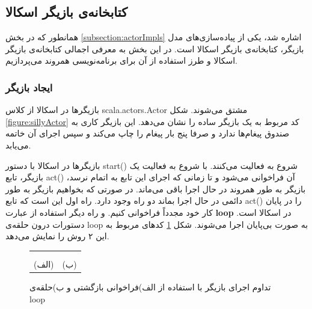 \subsection{کتابخانه‌ی بازیگر اسکالا}
\label{section:scalaActorLib}
همانطور که در بخش \ref{subsection:actorImpls} اشاره شد، یکی از پیاده‌سازی‌های مدل بازیگر، کتابخانه‌ی بازیگر اسکالا است. در این بخش به معرفی اجمالی کتابخانه‌ی بازیگر اسکالا و طرز استفاده از آن برای برنامه‌نویسی همروند می‌پردازیم.
\subsubsection{ایجاد بازیگر}
بازیگر‌ها در اسکالا از کلاس scala.actors.Actor مشتق می‌شوند.  شکل \ref{figure:sillyActor} کد مربوط به  یک بازیگر ساده را نشان می‌دهد. این بازیگر کاری به صندوق پیغام‌ها ندارد و صرفا پنج بار پیغام  را چاپ می‌کند و سپس اجرای آن خاتمه می‌یابد.


  بازیگر‌ها در اسکالا با دستور start() شروع به فعالیت می‌کنند. با شروع به فعالیت یک بازیگر، تابع act() آن فراخوانی می‌شود و تا زمانی که اجرای این تابع به اتمام نرسد، بازیگر به طور همروند در حال اجرا باقی می‌ماند. در صورتی که بخواهیم بازیگر به طور دائمی در حال اجرا بماند دو راه وجود دارد. راه اول این است که تابع act() را در پایان کار  خود مجدداً فراخوانی کنیم. و راه دیگر استفاده از عبارت \textbf{loop} در اسکالا است. دستورات درون حلقه‌ی loop به صورت بی‌پایان اجرا می‌شوند. شکل \ref{fig:endlessActor} کدهای مربوط به این ۲ روش را نمایش می‌دهد.

\begin{figure}
    \begin{center}
    \begin{tabular}{ c  c }
	 & \\

	\begin{latin}
\linespread{1.1}

\end{latin} & 
 \begin{latin}
	\linespread{1.1}
	
\end{latin}
 	\\
         (الف) & (ب) \\
    \end{tabular}
    \end{center}
    \caption{\label{fig:endlessActor} تداوم اجرای بازیگر با استفاده از الف)فراخوانی بازگشتی و ب)حلقه‌ی loop}
\end{figure}


